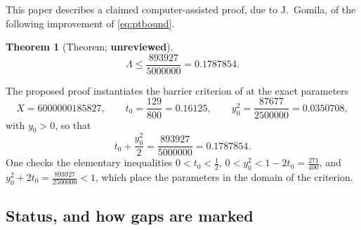 \documentclass[11pt]{article}
\newtheorem{theorem}{Theorem}[section]
\theoremstyle{definition}
\newcommand{\LB}{\Lambda}
\begin{document}
This paper describes a claimed computer-assisted proof, due to
J.~Gomila, of the following improvement of \eqref{eq:ptbound}.

\begin{theorem}[Theorem; \textbf{unreviewed}]\label{thm:main}
\[
\LB\le\frac{893927}{5000000}=0.1787854 .
\]
\end{theorem}

The proposed proof instantiates the barrier criterion of
\cite[Theorem~1.2]{Polymath} at the exact parameters
\begin{equation}\label{eq:params}
X=6000000185827,\qquad
t_0=\frac{129}{800}=0.16125,\qquad
y_0^2=\frac{87677}{2500000}=0.0350708,
\end{equation}
with $y_0>0$, so that
\begin{equation}\label{eq:target}
t_0+\frac{y_0^2}{2}=\frac{893927}{5000000}=0.1787854 .
\end{equation}
One checks the elementary inequalities
$0<t_0<\tfrac12$, $0<y_0^2<1-2t_0=\tfrac{271}{400}$, and
$y_0^2+2t_0=\tfrac{893927}{2500000}<1$, which place the parameters in
the domain of the criterion.

\subsection{Status, and how gaps are marked}\label{sec:status}
\end{document}
